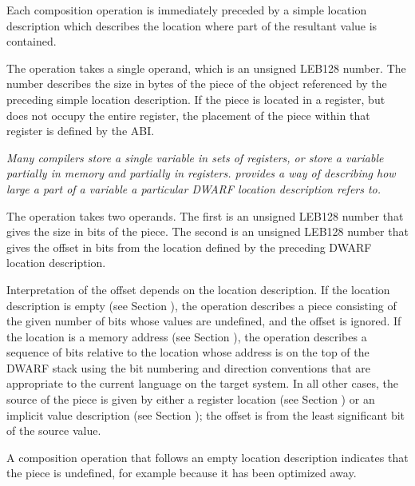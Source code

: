 Each composition operation is immediately preceded by a simple
location description which describes the location where part
of the resultant value is contained.
\begin{enumerate}[1. ]
\itembfnl{\DWOPpieceTARG}
The \DWOPpieceNAME{} operation takes a 
single operand, which is an
unsigned LEB128 number.  
The number describes the size in bytes
of the piece of the object referenced by the preceding simple
location description. If the piece is located in a register,
but does not occupy the entire register, the placement of
the piece within that register is defined by the ABI.

\textit{Many compilers store a single variable in sets of registers,
or store a variable partially in memory and partially in
registers. \DWOPpieceNAME{} provides a way of describing how large
a part of a variable a particular DWARF location description
refers to.}

\itembfnl{\DWOPbitpieceTARG}
The \DWOPbitpieceNAME{} operation takes two operands. 
The first is an unsigned LEB128 
number that gives the size in bits
of the piece. The second is an 
unsigned LEB128 number that
gives the offset in bits from the location defined by the
preceding DWARF location description.  

Interpretation of the offset depends on the location description.
If the location description is  
\bb
empty (see Section ),
the \DWOPbitpieceNAME{} operation
describes a piece consisting of the given number of bits whose values
are undefined, and the offset is ignored.
\eb
\db
If the location is a memory
\bb 
address (see Section ),
\eb 
the \DWOPbitpieceNAME{} operation describes a
sequence of bits relative to the location whose address is
on the top of the DWARF stack using the bit numbering and
direction conventions that are appropriate to the current
language on the target system. 
\bb
In all other cases, the source of the piece is given by either a 
register location (see Section ) or an
implicit value description 
(see Section ); 
the offset is from the least significant bit of the source value.
\eb
\end{enumerate}

\bb
A composition operation that follows an empty location description indicates
that the piece is undefined, for example because it has been optimized away.
\eb


